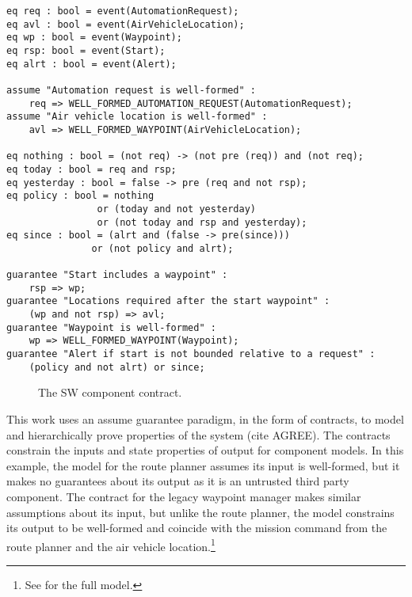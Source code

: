 \newsavebox{\sw}
\begin{lrbox}{\sw}
\begin{lstlisting}[style=agree]
eq req : bool = event(AutomationRequest);
eq avl : bool = event(AirVehicleLocation);
eq wp : bool = event(Waypoint);
eq rsp: bool = event(Start);
eq alrt : bool = event(Alert);
            
assume "Automation request is well-formed" :
    req => WELL_FORMED_AUTOMATION_REQUEST(AutomationRequest);
assume "Air vehicle location is well-formed" :
    avl => WELL_FORMED_WAYPOINT(AirVehicleLocation);
    
eq nothing : bool = (not req) -> (not pre (req)) and (not req);
eq today : bool = req and rsp;    
eq yesterday : bool = false -> pre (req and not rsp);
eq policy : bool = nothing
                or (today and not yesterday)
                or (not today and rsp and yesterday);
eq since : bool = (alrt and (false -> pre(since))) 
               or (not policy and alrt);

guarantee "Start includes a waypoint" :
    rsp => wp;
guarantee "Locations required after the start waypoint" :
    (wp and not rsp) => avl;
guarantee "Waypoint is well-formed" :
    wp => WELL_FORMED_WAYPOINT(Waypoint);
guarantee "Alert if start is not bounded relative to a request" :
    (policy and not alrt) or since;
\end{lstlisting}
\end{lrbox}

\begin{figure}
  \begin{center}
    \scalebox{0.60}{\usebox{\sw}}
  \end{center}
  \caption{The SW component contract.}
  \label{fig:sw}
\end{figure}

This work uses an assume guarantee paradigm, in the form of contracts, to model and hierarchically prove properties of the system (cite AGREE). The contracts constrain the inputs and state properties of output for component models. In this example, the model for the route planner assumes its input is well-formed, but it makes no guarantees about its output as it is an untrusted third party component. The contract for the legacy waypoint manager makes similar assumptions about its input, but unlike the route planner, the model constrains its output to be well-formed and coincide with the mission command from the route planner and the air vehicle location.\footnote{See \cite{repo} for the full model.}

